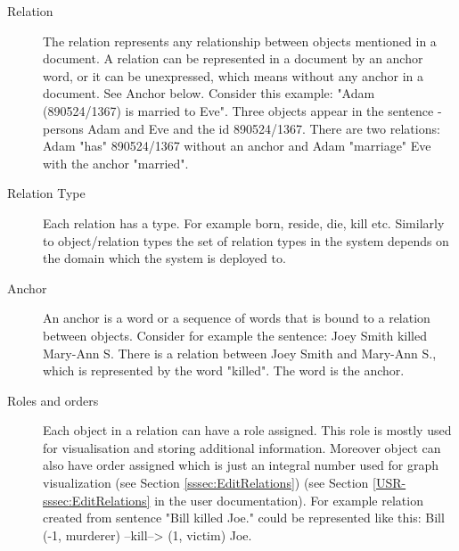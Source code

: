 \begin{description}
\item[Relation]
The relation represents any relationship between objects mentioned in a document.
A relation can be represented in a document by an anchor word, or it can be
unexpressed, which means without any anchor in a document. See Anchor below.
Consider this example: "Adam (890524/1367) is married to Eve". Three objects
appear in the sentence - persons Adam and Eve and the id 890524/1367. There
are two relations: Adam "has" 890524/1367 without an anchor and Adam "marriage"
Eve with the anchor "married".

\item[Relation Type]
Each relation has a type. For example born, reside, die, kill etc. Similarly to
object/relation types the set of relation types in the system depends on the
domain which the system is deployed to.

\item[Anchor]
An anchor is a word or a sequence of words that is bound to a relation between
objects. Consider for example the sentence: Joey Smith killed Mary-Ann S. There
is a relation between Joey Smith and Mary-Ann S., which is represented by the
word "killed". The word is the anchor. 

\item[Roles and orders]
Each object in a relation can have a role assigned. This role is mostly used
for visualisation and storing additional information. Moreover object can also
have order assigned which is just an integral number used for graph
visualization\ifdefined\USRDOC{} (see Section \ref{sssec:EditRelations})\fi{}
\ifdefined\DEVDOC{} (see Section \ref{USR-sssec:EditRelations} in the user
documentation)\fi{}. For example relation created from sentence
"Bill killed Joe." could be represented like this:
Bill (-1, murderer) --kill--> (1, victim) Joe.
\end{description}

